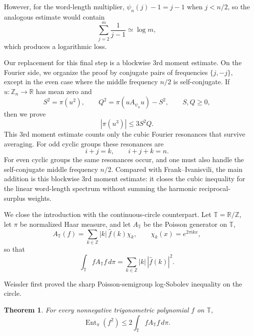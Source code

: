 \documentclass[11pt]{amsart}
\numberwithin{equation}{section}
\theoremstyle{plain}
\newtheorem{theorem}{Theorem}
\theoremstyle{remark}
\newcommand{\ZZ}{\mathbb Z}
\newcommand{\RR}{\mathbb R}
\newcommand{\Zn}[1]{\mathbb Z_{#1}}
\newcommand{\wh}[1]{\widehat{#1}}
\newcommand{\psin}{\psi_n}
\newcommand{\Apsi}{A_{\psin}}
\newcommand{\Ssymbol}{S}
\newcommand{\Qsymbol}{Q}
\newcommand{\Ssq}{\Ssymbol^2}
\newcommand{\Qsq}{\Qsymbol^2}
\newcommand{\TT}{\mathbb T}
\newcommand{\muT}{\pi}
\newcommand{\AT}{A_{\TT}}
\newcommand{\AvgT}[1]{\int_{\TT} #1\,d\muT}
\newcommand{\EntT}[1]{\operatorname{Ent}_{\muT}\!\left(#1\right)}
\newcommand{\AvgSymbol}{\pi}
\newcommand{\Avg}[1]{\AvgSymbol\!\left(#1\right)}
\newcommand{\abs}[1]{\left|#1\right|}
\newcommand{\ii}{\mathrm i}
\begin{document}
However, for the word-length multiplier, $\psin(j)-1=j-1$ when $j<n/2$, so the analogous estimate would contain
\[
  \sum_{j=2}^{m}\frac1{j-1}\simeq\log m,
\]
which produces a logarithmic loss.

Our replacement for this final step is a blockwise 3rd moment estimate.  On the Fourier side, we organize
the proof by conjugate pairs of frequencies \(\{j,-j\}\), except in the even case
where the middle frequency \(n/2\) is self-conjugate.  If \(u:\Zn{n}\to \RR\) has mean zero and
\begin{equation}\label{SQ}
     \Ssq=\Avg{u^2},\qquad \Qsq=\Avg{u\Apsi u}-\Ssq,
     \qquad \Ssymbol,\Qsymbol\ge0,
\end{equation}
then we prove
\[
  \abs{\Avg{u^3}}\le 3\Ssq\Qsymbol.
\]
This 3rd moment estimate counts only the cubic Fourier resonances that survive averaging.
For odd cyclic groups these resonances are
\[
  i+j=k,
  \qquad
  i+j+k=n.
\]
For even cyclic groups the same resonances occur, and one must also handle the
self-conjugate middle frequency \(n/2\).  Compared with Frank--Ivanisvili, the main addition is this blockwise 3rd moment estimate: it closes the cubic inequality for the linear word-length spectrum without summing the harmonic reciprocal-surplus weights.


\bigskip

We close the introduction with the continuous-circle counterpart.  Let
\(\TT=\RR/\ZZ\), let \(\muT\) be normalized Haar measure, and let \(\AT\) be
the Poisson generator on \(\TT\),
\[
  \AT (f)=\sum_{k\in\ZZ}\abs{k}\,\wh f(k)\chi_k,
  \qquad
  \chi_k(x)=e^{2\pi\ii kx},
\]
so that
\[
  \AvgT{f\AT f}=\sum_{k\in\ZZ}\abs{k}\,\abs{\wh f(k)}^2.
\]

Weissler \cite{Weissler1980} first proved the sharp Poisson-semigroup log-Sobolev inequality on the circle. 

\begin{theorem}\label{thm:circle}
For every nonnegative trigonometric polynomial \(f\) on \(\TT\),
\[
  \EntT{f^2}\le 2\AvgT{f\AT f}.
\]
\end{theorem}
\end{document}
